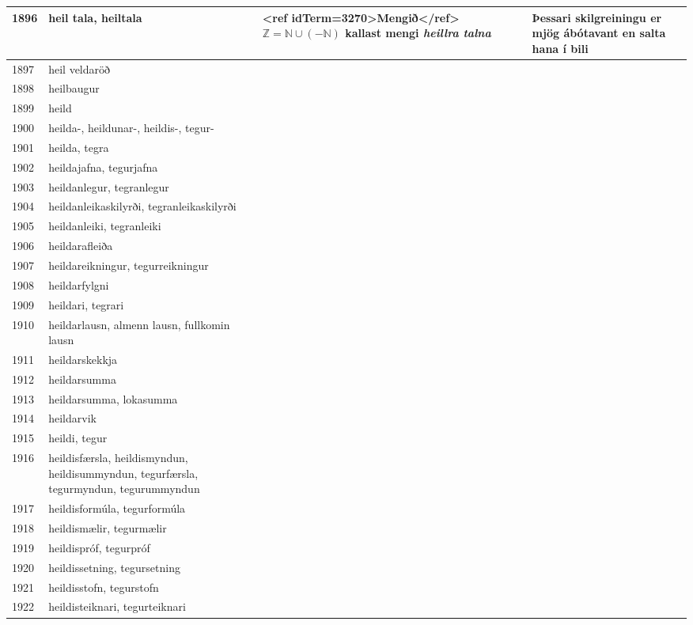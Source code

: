 \begin{longtable}{p{}|p{}|p{}|p{}|p{}}
\hline
1896 & heil tala, heiltala & <ref idTerm=3270>Mengið</ref> $\mathbb{Z}=\mathbb{N} \cup (-\mathbb{N})$ kallast mengi \textit{heillra talna} &  & Þessari skilgreiningu er mjög ábótavant en salta hana í bili \\
\hline
1897 & heil veldaröð &  &  &  \\
\hline
1898 & heilbaugur &  &  &  \\
\hline
1899 & heild &  &  &  \\
\hline
1900 & heilda-, heildunar-, heildis-, tegur- &  &  &  \\
\hline
1901 & heilda, tegra &  &  &  \\
\hline
1902 & heildajafna, tegurjafna &  &  &  \\
\hline
1903 & heildanlegur, tegranlegur &  &  &  \\
\hline
1904 & heildanleikaskilyrði, tegranleikaskilyrði &  &  &  \\
\hline
1905 & heildanleiki, tegranleiki &  &  &  \\
\hline
1906 & heildarafleiða &  &  &  \\
\hline
1907 & heildareikningur, tegurreikningur &  &  &  \\
\hline
1908 & heildarfylgni &  &  &  \\
\hline
1909 & heildari, tegrari &  &  &  \\
\hline
1910 & heildarlausn, almenn lausn, fullkomin lausn &  &  &  \\
\hline
1911 & heildarskekkja &  &  &  \\
\hline
1912 & heildarsumma &  &  &  \\
\hline
1913 & heildarsumma, lokasumma &  &  &  \\
\hline
1914 & heildarvik &  &  &  \\
\hline
1915 & heildi, tegur &  &  &  \\
\hline
1916 & heildisfærsla, heildismyndun, heildisummyndun, tegurfærsla, tegurmyndun, tegurummyndun &  &  &  \\
\hline
1917 & heildisformúla, tegurformúla &  &  &  \\
\hline
1918 & heildismælir, tegurmælir &  &  &  \\
\hline
1919 & heildispróf, tegurpróf &  &  &  \\
\hline
1920 & heildissetning, tegursetning &  &  &  \\
\hline
1921 & heildisstofn, tegurstofn &  &  &  \\
\hline
1922 & heildisteiknari, tegurteiknari &  &  &  \\

\end{longtable}

